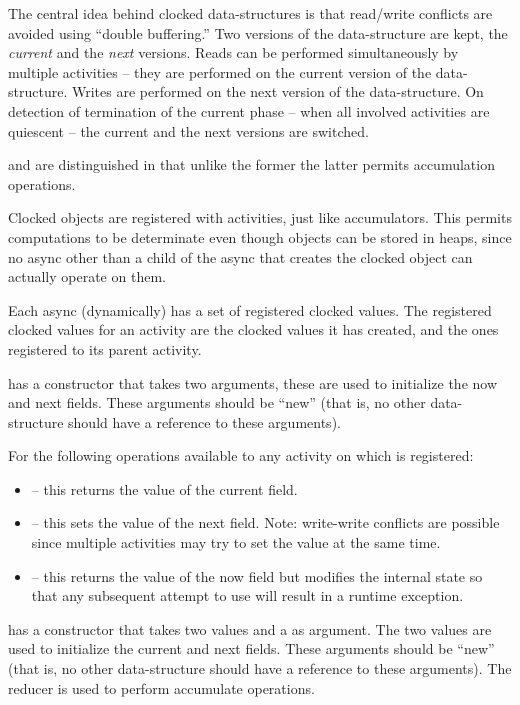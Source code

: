 The central idea behind clocked data-structures is that read/write
conflicts are avoided using ``double buffering.'' Two versions of the
data-structure are kept, the {\em current} and the {\em next}
versions. Reads can be performed simultaneously by multiple activities
-- they are performed on the current version of the
data-structure. Writes are performed on the next version of the
data-structure. On detection of termination of the current phase --
when all involved activities are quiescent -- the current and the next
versions are switched.

 and  are distinguished in that
unlike the former the latter permits accumulation operations.

Clocked objects are registered with activities, just like
accumulators.  This permits computations to be determinate even though
objects can be stored in heaps, since no async other than a child of
the async that creates the clocked object can actually operate on
them.

Each async (dynamically) has a set of registered clocked values. The
registered clocked values for an activity are the clocked values it
has created, and the ones registered to its parent activity.

  has a constructor that takes two  arguments, these are
used to initialize the now and next fields. These arguments should be
``new'' (that is, no other data-structure should have a reference to
these arguments). 

For  the following operations available to any activity on which 
is registered:
\begin{itemize}
\item {} -- this returns the value of the current field. 
\item {} -- this sets the value of the next field. Note:
     write-write conflicts are possible since multiple activities may
     try to set the value at the same time.
\item{} -- this returns the value of the now field
  but modifies the internal state so that any subsequent attempt to
  use  will result in a runtime exception.
\end{itemize}

 has a constructor that takes two  values and a
 as argument. The two  values are used to initialize the
current and next fields. These arguments should be ``new'' (that is, no
other data-structure should have a reference to these arguments). The
reducer is used to perform accumulate operations.

